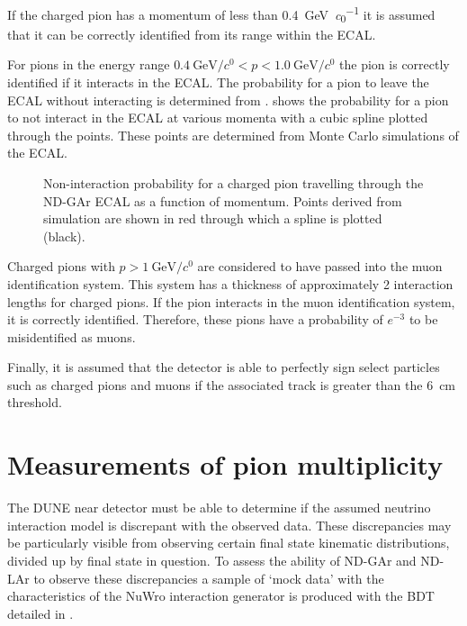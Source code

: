 If the charged pion has a momentum of less than \SI{0.4}{\GeV\per\clight} it is assumed that it can be correctly identified from its range within the ECAL.

For pions in the energy range $\SI{0.4}{\GeV\per\clight} < p < \SI{1.0}{\GeV\per\clight}$ the pion is correctly identified if it interacts in the ECAL.
The probability for a pion to leave the ECAL without interacting is determined from .
 shows the probability for a pion to not interact in the ECAL at various momenta with a cubic spline plotted through the points.
These points are determined from Monte Carlo simulations of the ECAL.

\begin{figure}[h]
	\centering
	\begin{adjustbox}{max totalsize=.6\linewidth, center}
		
	\end{adjustbox}
	\caption[Non-interaction probability for a charged pion travelling through the ND-GAr ECAL as a function of momentum.]{Non-interaction probability for a charged pion travelling through the ND-GAr ECAL as a function of momentum. Points derived from simulation are shown in red through which a spline is plotted (black).}
	\label{fig:interactionSpline}
\end{figure}

Charged pions with $p>\SI{1}{\GeV\per\clight}$ are considered to have passed into the muon identification system. 
This system has a thickness of approximately 2 interaction lengths for charged pions.
If the pion interacts in the muon identification system, it is correctly identified.
Therefore, these pions have a probability of $e^{-3}$ to be misidentified as muons.

Finally, it is assumed that the detector is able to perfectly sign select particles such as charged pions and muons if the associated track is greater than the \SI{6}{\cm} threshold.

\section{Measurements of pion multiplicity}
\label{sec:dune_ndrwt:pionMulti}

The DUNE near detector must be able to determine if the assumed neutrino interaction model is discrepant with the observed data.
These discrepancies may be particularly visible from observing certain final state kinematic distributions, divided up by final state in question.
To assess the ability of ND-GAr and ND-LAr to observe these discrepancies a sample of `mock data' with the characteristics of the NuWro interaction generator is produced with the BDT detailed in .

